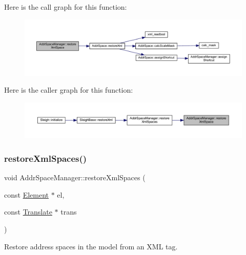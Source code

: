 Here is the call graph for this function\+:
\nopagebreak
\begin{figure}[H]
\begin{center}
\leavevmode
\includegraphics[width=350pt]{class_addr_space_manager_a107cb2ba1e4c562090ac1ad3b94cd16b_cgraph}
\end{center}
\end{figure}
Here is the caller graph for this function\+:
\nopagebreak
\begin{figure}[H]
\begin{center}
\leavevmode
\includegraphics[width=350pt]{class_addr_space_manager_a107cb2ba1e4c562090ac1ad3b94cd16b_icgraph}
\end{center}
\end{figure}
\mbox{\label{class_addr_space_manager_a196d3c70790942337861ae7d571c5e31}} 
\subsubsection{\texorpdfstring{restoreXmlSpaces()}{restoreXmlSpaces()}}
{\footnotesize\ttfamily void Addr\+Space\+Manager\+::restore\+Xml\+Spaces (\begin{DoxyParamCaption}\item[{const \mbox{\hyperlink{class_element}{Element}} $\ast$}]{el,  }\item[{const \mbox{\hyperlink{class_translate}{Translate}} $\ast$}]{trans }\end{DoxyParamCaption})\hspace{0.3cm}{\ttfamily [protected]}}



Restore address spaces in the model from an X\+ML tag. 


